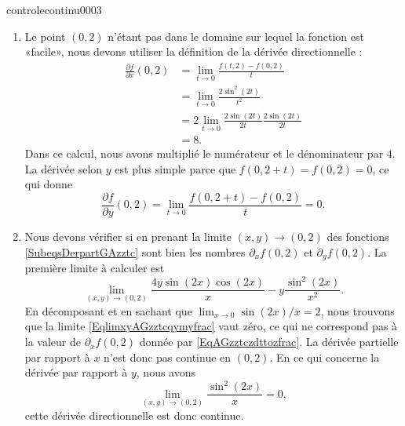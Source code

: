 \begin{corrige}{controlecontinu0003}
\begin{enumerate}
            \item
                Le point \( (0,2)\) n'étant pas dans le domaine sur lequel la fonction est «facile», nous devons utiliser la définition de la dérivée directionnelle :
                \begin{subequations}
                    \begin{align}
                        \frac{ \partial f }{ \partial x }(0,2)&=\lim_{t\to 0} \frac{ f(t,2)-f(0,2) }{ t }\\
                        &=\lim_{t\to 0} \frac{ 2\sin^2(2t) }{ t^2 }\\
                        &=2\lim_{t\to 0} \frac{ 2\sin(2t) }{ 2t }\frac{ 2\sin(2t) }{ 2t }\\
                        &=8.
                    \end{align}
                \end{subequations}
                Dans ce calcul, nous avons multiplié le numérateur et le dénominateur par \( 4\). La dérivée selon \( y\) est plus simple parce que \( f(0,2+t)=f(0,2)=0\), ce qui donne
                \begin{equation}        \label{EqAGzztczdttozfrac}
                    \frac{ \partial f }{ \partial y }(0,2)=\lim_{t\to 0} \frac{ f(0,2+t)-f(0,2) }{ t }=0.
                \end{equation}

            \item
                Nous devons vérifier si en prenant la limite \( (x,y)\to(0,2)\) des fonctions \eqref{SubeqsDerpartGAzztc} sont bien les nombres \( \partial_xf(0,2)\) et \( \partial_yf(0,2)\). La première limite à calculer est
                \begin{equation}        \label{EqlimxyAGzztcqymyfrac}
                    \lim_{(x,y)\to(0,2)}\frac{ 4y\sin(2x)\cos(2x) }{ x }-y\frac{ \sin^2(2x) }{ x^2 }.
                \end{equation}
                En décomposant et en sachant que \( \lim_{x\to 0} \sin(2x)/x=2\), nous trouvons que la limite \eqref{EqlimxyAGzztcqymyfrac} vaut zéro, ce qui ne correspond pas à la valeur de \( \partial_xf(0,2)\) donnée par \eqref{EqAGzztczdttozfrac}. La dérivée partielle par rapport à \( x\) n'est donc pas continue en \( (0,2)\). En ce qui concerne la dérivée par rapport à \( y\), nous avons
                \begin{equation}
                    \lim_{(x,y)\to(0,2)}\frac{ \sin^2(2x) }{ x }=0,
                \end{equation}
                cette dérivée directionnelle est donc continue.


\end{enumerate}
\end{corrige}
